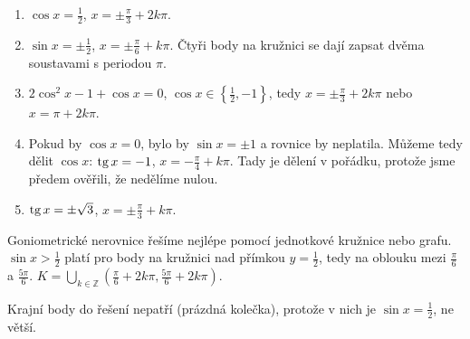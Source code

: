 \begin{solution}
  \begin{enumerate}[label=(\alph*)]
    \item $\cos x = \frac{1}{2}$, $x = \pm\frac{\pi}{3} + 2k\pi$.
    \item $\sin x = \pm\frac{1}{2}$, $x = \pm\frac{\pi}{6} + k\pi$. Čtyři body na kružnici se dají zapsat dvěma soustavami s periodou $\pi$.
    \item $2\cos^2 x - 1 + \cos x = 0$, $\cos x\in\left\{\frac{1}{2}, -1\right\}$, tedy $x = \pm\frac{\pi}{3} + 2k\pi$ nebo $x = \pi + 2k\pi$.
    \item Pokud by $\cos x = 0$, bylo by $\sin x = \pm 1$ a rovnice by neplatila. Můžeme tedy dělit $\cos x$: $\operatorname{tg} x = -1$, $x = -\frac{\pi}{4} + k\pi$. Tady je dělení v pořádku, protože jsme předem ověřili, že nedělíme nulou.
    \item $\operatorname{tg} x = \pm\sqrt{3}$, $x = \pm\frac{\pi}{3} + k\pi$.
  \end{enumerate}
\end{solution}

\begin{example}
  Goniometrické nerovnice řešíme nejlépe pomocí jednotkové kružnice nebo grafu. $\sin x > \frac{1}{2}$ platí pro body na kružnici nad přímkou $y = \frac{1}{2}$, tedy na oblouku mezi $\frac{\pi}{6}$ a $\frac{5\pi}{6}$. $K = \bigcup_{k\in\mathbb{Z}}\left(\frac{\pi}{6} + 2k\pi, \frac{5\pi}{6} + 2k\pi\right)$.

  \begin{center}
  \end{center}
  Krajní body do řešení nepatří (prázdná kolečka), protože v nich je $\sin x = \frac{1}{2}$, ne větší.
\end{example}

